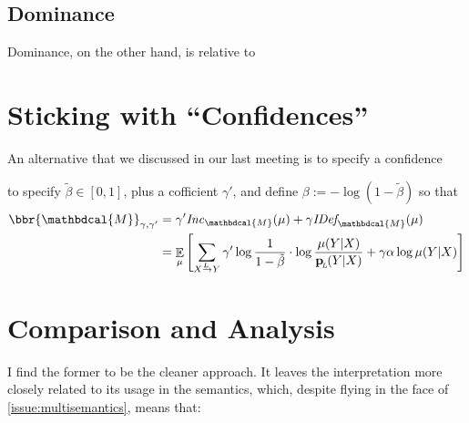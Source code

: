 \documentclass[twoside]{article} %
\theoremstyle{plain}
\theoremstyle{definition}
\DeclareMathOperator*{\Ex}{\mathbb{E}} %
\newcommand{\mat}[1]{\mathbf{#1}}
\newcommand{\ssub}[1]{_{\!_{#1}\!}}
\newcommand{\bp}[1][L]{\mat{p}\ssub{#1}}
\newcommand{\dg}[1]{\mathbdcal{#1}}
\newcommand\Inc{\mathit{Inc}}
\newcommand{\IDef}[1]{\mathit{IDef}_{\!#1}}
\newcommand{\ed}[3]{#2%
    	  \overset{\smash{\mskip-5mu\raisebox{-1pt}{$\scriptscriptstyle
    	        #1$}}}{\rightarrow} #3}
\begin{document}
    
    \subsection{Dominance}
    \begin{center}
    \end{center}
    Dominance, on the other hand, is relative to 
    
    
    \section{Sticking with ``Confidences''} \label{sec:sticking-to-confidence}
    An alternative that we discussed in our last meeting is to specify a confidence
    
    to specify $\tilde\beta \in [0,1]$, plus a cofficient $\gamma'$, and define
    $ 
        \beta := - \log ({1-\tilde\beta})
    $
    so that
    \begin{align*}
        \bbr{\dg M}_{\gamma,\gamma'} 
            &= \gamma' \Inc_{\dg M}(\mu) + \gamma \IDef{\dg M}(\mu) \\
            &= \Ex_{\mu} \left[
                \sum_{\ed LXY} \gamma' \log \frac1{1-\tilde\beta}\cdot\log \frac{\mu(Y|X)}{\bp(Y|X)}  + \gamma \alpha \log \mu(Y|X) 
                \right]
    \end{align*}
    
    
    \section{Comparison and Analysis} \label{sec:analysis}
    I find the former to be the cleaner approach. It leaves the interpretation more closely related to its usage in the semantics, which, despite flying in the face of \cref{issue:multisemantics}, means that:
    
\end{document}
